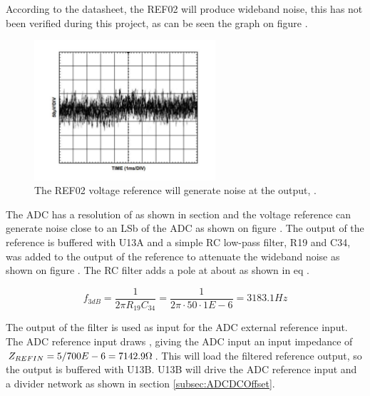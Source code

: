 According to the datasheet, the REF02 will produce wideband noise, this has not been verified during this project, as can be seen the graph on figure  .
\begin{figure}[H]
    \centering
    \includegraphics[clip, trim=0 25 0 0, width=0.6\textwidth]{Sections/7_SystemDesign/Figures/7_1_3_REFNoise.pdf}
    \caption{The REF02 voltage reference will generate noise at the output, \cite{REF02}.}
    \label{fig_7_1_3_REFNOISE}
\end{figure}

The ADC has a resolution of  as shown in section  and the voltage reference can generate noise close to an LSb of the ADC as shown on figure . The output of the reference is buffered with U13A and a simple RC low-pass filter, R19 and C34, was added to the output of the reference to attenuate the wideband noise as shown on figure . The RC filter adds a pole at about  as shown in eq .

\begin{equation}\label{eq:7_1_3_5VREFSimplePole}
    f_{3dB} = \frac{1}{2\pi R_{19} C_{34}} = \frac{1}{2\pi\cdot50\cdot1E-6} = 3183.1 Hz
\end{equation}

The output of the filter is used as input for the ADC external reference input. The ADC reference input draws , giving the ADC input an input impedance of $Z_{REFIN} = 5/700E-6 = 7142.9 \ohm$. This will load the filtered reference output, so the output is buffered with U13B. U13B will drive the ADC reference input and a divider network as shown in section \ref{subsec:ADCDCOffset}.

